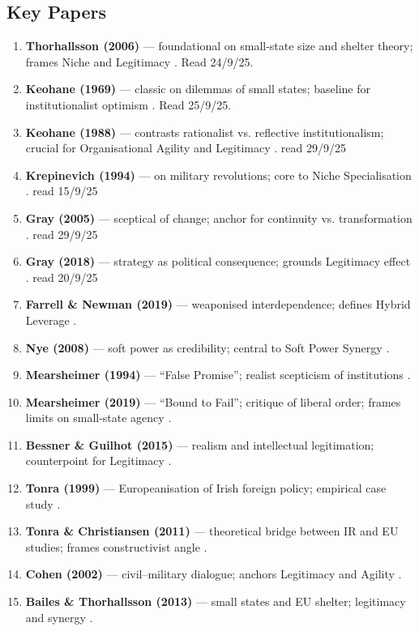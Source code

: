 \subsection*{Key Papers}
\begin{enumerate}
	\item \textbf{Thorhallsson (2006)} — foundational on small-state size and shelter theory; frames Niche and Legitimacy \parencite{THORHALLSSON_2006}. Read 24/9/25.
	\item \textbf{Keohane (1969)} — classic on dilemmas of small states; baseline for institutionalist optimism \parencite{KEOHANE_1969}. Read 25/9/25.
	\item \textbf{Keohane (1988)} — contrasts rationalist vs. reflective institutionalism; crucial for Organisational Agility and Legitimacy \parencite{KEOHANE_1988}. read 29/9/25
	\item \textbf{Krepinevich (1994)} — on military revolutions; core to Niche Specialisation \parencite{KREPINEVICH_1994}. read 15/9/25
	\item \textbf{Gray (2005)} — sceptical of change; anchor for continuity vs. transformation \parencite{GRAY_2005}. read 29/9/25
	\item \textbf{Gray (2018)} — strategy as political consequence; grounds Legitimacy effect \parencite{GRAY_2018}. read 20/9/25
	\item \textbf{Farrell \& Newman (2019)} — weaponised interdependence; defines Hybrid Leverage \parencite{FARRELL_2019}.
	\item \textbf{Nye (2008)} — soft power as credibility; central to Soft Power Synergy \parencite{NYE_2008}.
	\item \textbf{Mearsheimer (1994)} — ``False Promise''; realist scepticism of institutions \parencite{MEARSHEIMER_1994}.
	\item \textbf{Mearsheimer (2019)} — ``Bound to Fail''; critique of liberal order; frames limits on small-state agency \parencite{MEARSHEIMER_2019}.
	\item \textbf{Bessner \& Guilhot (2015)} — realism and intellectual legitimation; counterpoint for Legitimacy \parencite{BESSNER_2015}.
	\item \textbf{Tonra (1999)} — Europeanisation of Irish foreign policy; empirical case study \parencite{TONRA_1999}.
	\item \textbf{Tonra \& Christiansen (2011)} — theoretical bridge between IR and EU studies; frames constructivist angle \parencite{TONRA_2011}.
	\item \textbf{Cohen (2002)} — civil–military dialogue; anchors Legitimacy and Agility \parencite{COHEN_2002}.
	\item \textbf{Bailes \& Thorhallsson (2013)} — small states and EU shelter; legitimacy and synergy \parencite{BAILES_2013}.
\end{enumerate}

